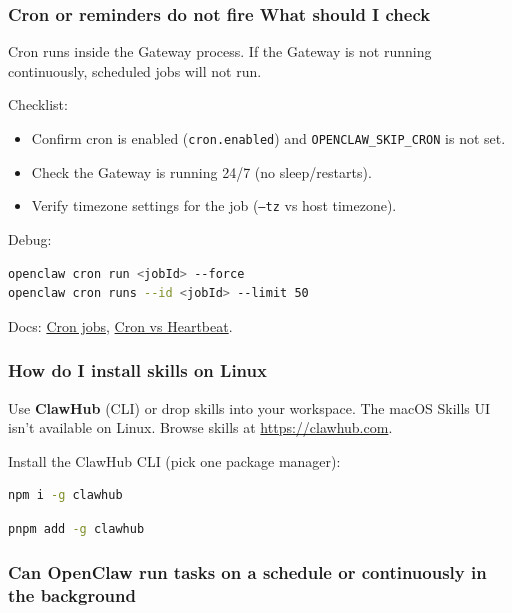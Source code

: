 \subsubsection{Cron or reminders do not fire What should I check}


Cron runs inside the Gateway process. If the Gateway is not running continuously,
scheduled jobs will not run.

Checklist:

\begin{itemize}
  \item Confirm cron is enabled (\texttt{cron.enabled}) and \texttt{OPENCLAW\_SKIP\_CRON} is not set.
  \item Check the Gateway is running 24/7 (no sleep/restarts).
  \item Verify timezone settings for the job (\texttt{--tz} vs host timezone).
\end{itemize}


Debug:

\begin{lstlisting}[language=bash]
openclaw cron run <jobId> --force
openclaw cron runs --id <jobId> --limit 50
\end{lstlisting}


Docs: \href{/automation/cron-jobs}{Cron jobs}, \href{/automation/cron-vs-heartbeat}{Cron vs Heartbeat}.

\subsubsection{How do I install skills on Linux}


Use \textbf{ClawHub} (CLI) or drop skills into your workspace. The macOS Skills UI isn't available on Linux.
Browse skills at \href{https://clawhub.com}{https://clawhub.com}.

Install the ClawHub CLI (pick one package manager):

\begin{lstlisting}[language=bash]
npm i -g clawhub
\end{lstlisting}


\begin{lstlisting}[language=bash]
pnpm add -g clawhub
\end{lstlisting}


\subsubsection{Can OpenClaw run tasks on a schedule or continuously in the background}


